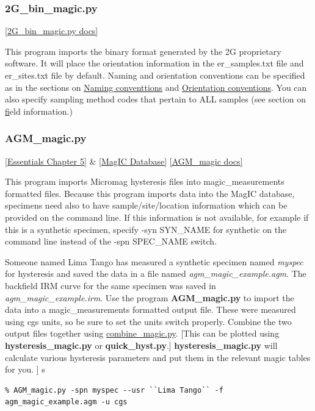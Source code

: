 \documentclass[11pt]{book}
\begin{document}
{{\subsubsection{2G\_bin\_magic.py}
\href{https://github.com/PmagPy/PmagPy/blob/master/programs/2G_bin_magic.py}{[2G\_bin\_magic.py docs]}

This program imports the binary format generated by the 2G proprietary software.   It will place the orientation information in the er\_samples.txt file and er\_sites.txt file by default.  Naming and orientation conventions can be specified as in the sections on \href{#naming_schemes}{Naming conventtions} and \href{#orientation_schemes}{Orientation conventions}.  You can also specify sampling method codes that pertain to ALL samples (see section on \href{#field_info} field information.)



\subsubsection {AGM\_magic.py} \href{http://earthref.org/MAGIC/books/Tauxe/Essentials/WebBook3ch5.html#ch5}{[Essentials Chapter 5]} \& \href{#MagICDatabase}{[MagIC Database]}
\href{https://github.com/PmagPy/PmagPy/blob/master/programs/AGM_magic.py}{[AGM\_magic docs]}


This program imports Micromag  hysteresis files into magic\_measurements formatted files.
Because this program imports data into the MagIC database, specimens need also to have sample/site/location information which can be provided on the command line. If this information is not available, for example if this is a synthetic specimen,  specify -syn  SYN\_NAME for synthetic on the command line instead of the -spn SPEC\_NAME switch.

Someone named Lima Tango has measured a  synthetic specimen named {\it myspec}  for hysteresis and saved the data in a file named {\it agm\_magic\_example.agm}.   The backfield IRM curve for the same specimen was saved in {\it agm\_magic\_example.irm}.  Use the program {\bf AGM\_magic.py} to import the data into a magic\_measurements formatted output file.  These were measured using cgs units, so be sure to set the units switch properly.   Combine the two output files together using \href{#combine_magic.py}{combine\_magic.py}.    [This can be plotted using {\bf hysteresis\_magic.py} or {\bf quick\_hyst.py}.]    {\bf hysteresis\_magic.py} will calculate various hysteresis parameters and put them in the relevant magic tables for you.  ]
s
\begin{verbatim}
% AGM_magic.py -spn myspec --usr ``Lima Tango`` -f agm_magic_example.agm -u cgs


\end{verbatim}}}
\end{document}
